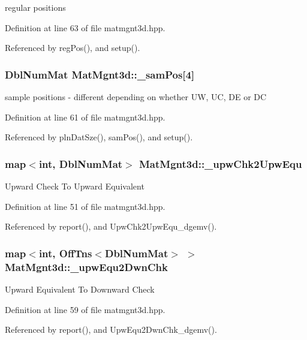 regular positions 

Definition at line 63 of file matmgnt3d.hpp.

Referenced by reg\-Pos(), and setup().
\subsubsection{\setlength{\rightskip}{0pt plus 5cm}Dbl\-Num\-Mat {\bf Mat\-Mgnt3d::\_\-sam\-Pos}[4]}\label{classMatMgnt3d_ba2fc588d5e34912fb575182f6d110c4_ba2fc588d5e34912fb575182f6d110c4}


sample positions - different depending on whether UW, UC, DE or DC 

Definition at line 61 of file matmgnt3d.hpp.

Referenced by pln\-Dat\-Sze(), sam\-Pos(), and setup().
\subsubsection{\setlength{\rightskip}{0pt plus 5cm}map$<$int, Dbl\-Num\-Mat$>$ {\bf Mat\-Mgnt3d::\_\-upw\-Chk2Upw\-Equ}}\label{classMatMgnt3d_b698e133e8b80af377013cfa83a64f9c_b698e133e8b80af377013cfa83a64f9c}


Upward Check To Upward Equivalent 

Definition at line 51 of file matmgnt3d.hpp.

Referenced by report(), and Upw\-Chk2Upw\-Equ\_\-dgemv().
\subsubsection{\setlength{\rightskip}{0pt plus 5cm}map$<$int, Off\-Tns$<$Dbl\-Num\-Mat$>$ $>$ {\bf Mat\-Mgnt3d::\_\-upw\-Equ2Dwn\-Chk}}\label{classMatMgnt3d_4433042b9af17fab86b8f035b255d886_4433042b9af17fab86b8f035b255d886}


Upward Equivalent To Downward Check 

Definition at line 59 of file matmgnt3d.hpp.

Referenced by report(), and Upw\-Equ2Dwn\-Chk\_\-dgemv().
